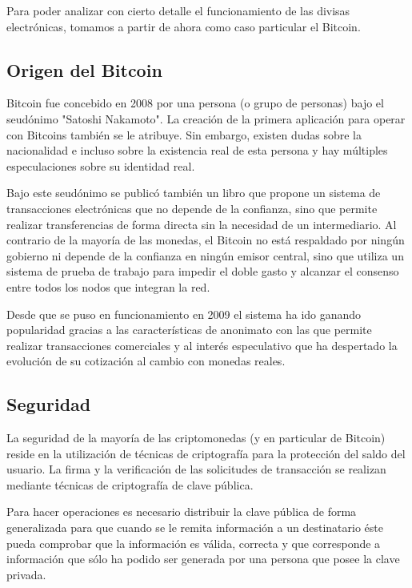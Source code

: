 Para poder analizar con cierto detalle el funcionamiento de las divisas electr\'onicas, tomamos a partir de ahora como caso particular el Bitcoin.

\subsection{Origen del Bitcoin}

Bitcoin fue concebido en 2008 por una persona (o grupo de personas) bajo el seud\'onimo "Satoshi Nakamoto". La creaci\'on de la primera aplicaci\'on para operar con Bitcoins tambi\'en se le atribuye. Sin embargo, existen dudas sobre la nacionalidad e incluso sobre la existencia real de esta persona y hay m\'ultiples especulaciones sobre su identidad real.

Bajo este seud\'onimo se public\'o tambi\'en un libro que propone un sistema de transacciones electr\'onicas que no depende de la confianza, sino que permite realizar transferencias de forma directa sin la necesidad de un intermediario. Al contrario de la mayor\'ia de las monedas, el Bitcoin no est\'a respaldado por ning\'un gobierno ni depende de la confianza en ning\'un emisor central, sino que utiliza un sistema de prueba de trabajo para impedir el doble gasto y alcanzar el consenso entre todos los nodos que integran la red.

Desde que se puso en funcionamiento en 2009 el sistema ha ido ganando popularidad 
gracias a las caracter\'isticas de anonimato con las que permite realizar transacciones 
comerciales y al inter\'es especulativo que ha despertado la evoluci\'on de su cotizaci\'on al 
cambio con monedas reales.

\subsection{Seguridad}

La seguridad de la mayor\'ia de las criptomonedas (y en particular de Bitcoin) reside en la utilizaci\'on de t\'ecnicas de criptograf\'ia para la protecci\'on del saldo del usuario. La firma y la verificaci\'on de las solicitudes de transacci\'on se realizan mediante t\'ecnicas de criptograf\'ia de clave p\'ublica. 
 
Para hacer operaciones es necesario distribuir la clave p\'ublica de forma generalizada para que cuando se le remita informaci\'on a un destinatario \'este pueda comprobar que la informaci\'on es v\'alida, correcta y que corresponde a informaci\'on que s\'olo ha podido ser generada por una persona que posee la clave privada.
 
